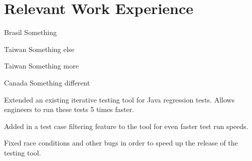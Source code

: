\documentclass[letterpaper]{deedy-resume} %
\begin{document}
\begin{minipage}[t]{0.66\textwidth} %


\section{Relevant Work Experience}


\vspace{\topsep} %

\begin{tightitemize}
\item Brasil Something
\item Taiwan Something else
\item Taiwan Something more
\item Canada Something different
\end{tightitemize}

\sectionspace %




\begin{tightitemize}
\item Extended an existing iterative testing tool for Java regression tests. Allows engineers to run these tests 5 times faster.
\item Added in a test case filtering feature to the tool for even faster test run speeds.
\item Fixed race conditions and other bugs in order to speed up the release of the testing tool.
\end{tightitemize}

\sectionspace %




\end{minipage}
\end{document}
